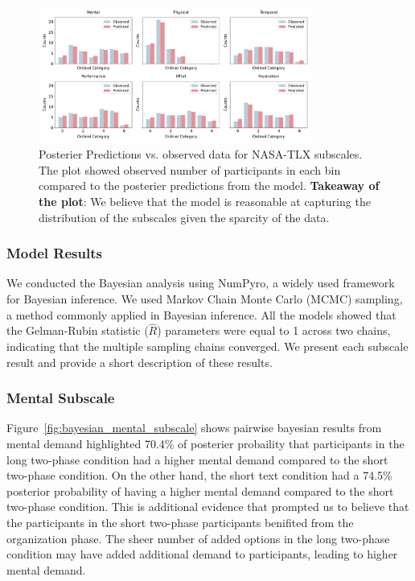 \begin{figure}[h!]
    \centering
    \includegraphics[width=0.8\textwidth]{content/image/cog/observed_vs_predicted_all_subscale.pdf}
    \caption{Posterier Predictions vs. observed data for NASA-TLX subscales. The plot showed observed number of participants in each bin compared to the posterier predictions from the model. \textbf{Takeaway of the plot}: We believe that the model is reasonable at capturing the distribution of the subscales given the sparcity of the data.}
    \label{fig:observed_vs_predicted_all_subscale}
\end{figure}

\subsubsection{Model Results}
We conducted the Bayesian analysis using NumPyro, a widely used framework for Bayesian inference. We used Markov Chain Monte Carlo (MCMC) sampling, a method commonly applied in Bayesian inference. All the models showed that the Gelman-Rubin statistic ($\hat{R}$) parameters were equal to 1 across two chains, indicating that the multiple sampling chains converged. We present each subscale result and provide a short description of these results.

\subsubsection{Mental Subscale}
Figure~\ref{fig:bayesian_mental_subscale} shows pairwise bayesian results from mental demand highlighted 70.4\% of posterier probaility that participants in the long two-phase condition had a higher mental demand compared to the short two-phase condition. On the other hand, the short text condition had a 74.5\% posterior probability of having a higher mental demand compared to the short two-phase condition. This is additional evidence that prompted us to believe that the participants in the short two-phase participants benifited from the organization phase. The sheer number of added options in the long two-phase condition may have added additional demand to participants, leading to higher mental demand.

